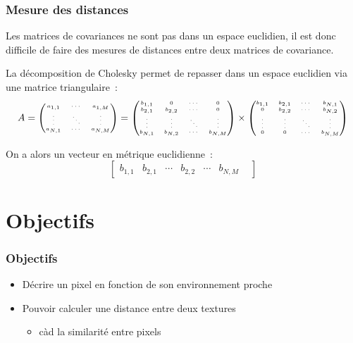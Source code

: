 \documentclass{beamer}
\begin{document}
\begin{frame}
    \frametitle{Mesure des distances}
    Les matrices de covariances ne sont pas dans un espace euclidien, il est donc difficile de faire des mesures de distances entre deux matrices de covariance.
    \vfill

    La décomposition de Cholesky permet de repasser dans un espace euclidien via une matrice triangulaire :
    \[
        \tiny \centering
        A =
        \begin{pmatrix}
            a_{1,1} & \cdots & a_{1,M} \\
            \vdots  & \ddots & \vdots  \\
            a_{N,1} & \cdots & a_{N,M} \\
        \end{pmatrix}
        =
        \begin{pmatrix}
            b_{1,1} & 0 & \cdots & 0 \\
            b_{2,1} & b_{2,2} & \cdots & 0 \\
            \vdots  & \vdots & \ddots & \vdots  \\
            b_{N,1} & b_{N,2} & \cdots & b_{N,M} \\
        \end{pmatrix}
        \times
        \begin{pmatrix}
            b_{1,1} & b_{2,1} & \cdots & b_{N,1} \\
            0       & b_{2,2} & \cdots & b_{N,2} \\
            \vdots  & \vdots  & \ddots & \vdots  \\
            0       & 0       & \cdots & b_{N,M}
        \end{pmatrix}
    \]

    On a alors un vecteur en métrique euclidienne :
    \[
        \begin{bmatrix}
            b_{1,1} &
            b_{2,1} &
            \cdots  &
            b_{2,2} &
            \cdots  &
            b_{N,M} &
        \end{bmatrix}
    \]
\end{frame}

\section{Objectifs}
\begin{frame}
    \frametitle{Objectifs}
    \begin{itemize}
        \item Décrire un pixel en fonction de son environnement proche
        \item Pouvoir calculer une distance entre deux textures
            \begin{itemize}
                \item càd la similarité entre pixels
            \end{itemize}
    \end{itemize}
\end{frame}
\end{document}
